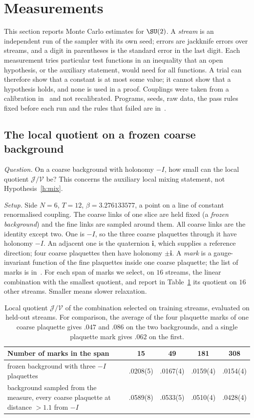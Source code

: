 \section{Measurements}\label{s:evid}
This section reports Monte Carlo estimates for $\SU(2)$. A \emph{stream} is an independent run of the sampler
with its own seed; errors are jackknife errors over streams, and a digit in parentheses is the standard error
in the last digit. Each measurement tries particular test functions in an inequality that an open
hypothesis, or the auxiliary statement, would need for all functions. A trial can therefore show that a
constant is at most some value; it cannot show that a hypothesis holds, and none is used in a proof. Couplings
were taken from a calibration in~\cite{RepoData} and not recalibrated. Programs, seeds, raw data, the pass
rules fixed before each run and the rules that failed are in~\cite{RepoData}.

\subsection{The local quotient on a frozen coarse background}\label{s:local}
\emph{Question.} On a coarse background with holonomy $-I$, how small can the local quotient
$\mathcal J/\mathcal V$ be? This concerns the auxiliary local mixing statement, not Hypothesis~\ref{h:mix}.

\emph{Setup.} Side $N=6$, $T=12$, $\beta=3.276133577$, a point on a line of constant renormalised coupling.
The coarse links of one slice are held fixed (a \emph{frozen background}) and the fine links are sampled
around them. All coarse links are the identity except two. One is $-I$, so the three coarse plaquettes through
it have holonomy $-I$. An adjacent one is the quaternion $\mathbf i$, which supplies a reference direction;
four coarse plaquettes then have holonomy $\pm\mathbf i$. A \emph{mark} is a gauge-invariant function of the fine
plaquettes inside one coarse plaquette; the list of marks is in~\cite{RepoData}. For each span of marks we
select, on $16$ streams, the linear combination with the smallest quotient, and report in
Table~\ref{tab:local} its quotient on $16$ other streams. Smaller means slower relaxation.

\begin{table}[ht]
\centering\small
\begin{tabular}{@{}p{}cccc@{}}
\toprule
Number of marks in the span & 15 & 49 & 181 & 308 \\
\midrule
frozen background with three $-I$ plaquettes & .0208(5) & .0167(4) & .0159(4) & .0154(4) \\
background sampled from the measure, every coarse plaquette at distance $>1.1$ from $-I$ & .0589(8) & .0533(5) & .0510(4) & .0428(4) \\
\bottomrule
\end{tabular}
\caption{Local quotient $\mathcal J/\mathcal V$ of the combination selected on training streams, evaluated on
held-out streams. For comparison, the average of the four plaquette marks of one coarse plaquette gives
$.047$ and $.086$ on the two backgrounds, and a single plaquette mark gives $.062$ on the first.}
\label{tab:local}
\end{table}

